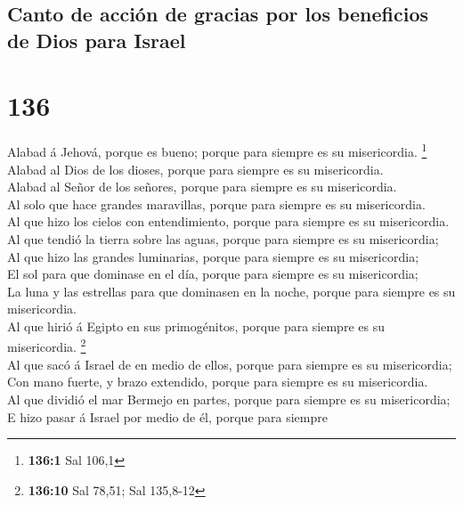 \hypertarget{canto-de-acciuxf3n-de-gracias-por-los-beneficios-de-dios-para-israel}{%
\subsection{Canto de acción de gracias por los beneficios de Dios para
Israel}\label{canto-de-acciuxf3n-de-gracias-por-los-beneficios-de-dios-para-israel}}

\hypertarget{section-135}{%
\section{136}\label{section-135}}

 Alabad á Jehová, porque es bueno; porque para siempre es su
misericordia. \footnote{\textbf{136:1} Sal 106,1}\\
 Alabad al Dios de los dioses, porque para siempre es su
misericordia.\\
 Alabad al Señor de los señores, porque para siempre es su
misericordia.\\
 Al solo que hace grandes maravillas, porque para siempre es
su misericordia.\\
 Al que hizo los cielos con entendimiento, porque para
siempre es su misericordia.\\
 Al que tendió la tierra sobre las aguas, porque para
siempre es su misericordia;\\
 Al que hizo las grandes luminarias, porque para siempre es
su misericordia;\\
 El sol para que dominase en el día, porque para siempre es
su misericordia;\\
 La luna y las estrellas para que dominasen en la noche,
porque para siempre es su misericordia.\\
 Al que hirió á Egipto en sus primogénitos, porque para
siempre es su misericordia. \footnote{\textbf{136:10} Sal 78,51; Sal
  135,8-12}\\
 Al que sacó á Israel de en medio de ellos, porque para
siempre es su misericordia;\\
 Con mano fuerte, y brazo extendido, porque para siempre es
su misericordia.\\
 Al que dividió el mar Bermejo en partes, porque para
siempre es su misericordia;\\
 E hizo pasar á Israel por medio de él, porque para siempre
